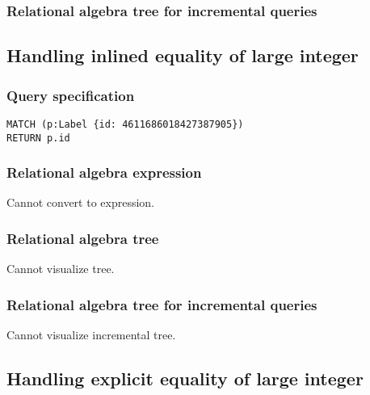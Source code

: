 \subsubsection*{Relational algebra tree for incremental queries}


\subsection{Handling inlined equality of large integer}

\subsubsection*{Query specification}

\begin{lstlisting}
MATCH (p:Label {id: 4611686018427387905})
RETURN p.id
\end{lstlisting}

\subsubsection*{Relational algebra expression}

Cannot convert to expression.

\subsubsection*{Relational algebra tree}

Cannot visualize tree.

\subsubsection*{Relational algebra tree for incremental queries}

Cannot visualize incremental tree.

\subsection{Handling explicit equality of large integer}

